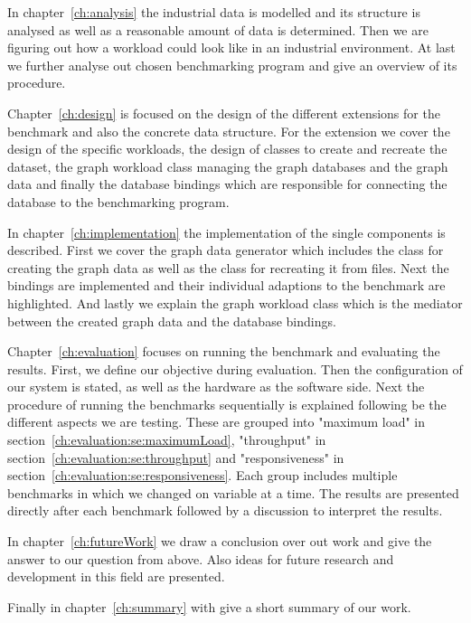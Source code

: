 In chapter~\ref{ch:analysis} the industrial data is modelled and its structure is analysed as well as a reasonable amount of data is determined.
Then we are figuring out how a workload could look like in an industrial environment.
At last we further analyse out chosen benchmarking program and give an overview of its procedure.

Chapter~\ref{ch:design} is focused on the design of the different extensions for the benchmark and also the concrete data structure.
For the extension we cover the design of the specific workloads,
the design of classes to create and recreate the dataset,
the graph workload class managing the graph databases and the graph data and finally the database bindings which are responsible for connecting the database to the benchmarking program.

In chapter~\ref{ch:implementation} the implementation of the single components is described.
First we cover the graph data generator which includes the class for creating the graph data as well as the class for recreating it from files.
Next the bindings are implemented and their individual adaptions to the benchmark are highlighted.
And lastly we explain the graph workload class which is the mediator between the created graph data and the database bindings.

Chapter~\ref{ch:evaluation} focuses on running the benchmark and evaluating the results.
First, we define our objective during evaluation.
Then the configuration of our system is stated, as well as the hardware as the software side.
Next the procedure of running the benchmarks sequentially is explained following be the different aspects we are testing.
These are grouped into "maximum load" in section~\ref{ch:evaluation:se:maximumLoad}, "throughput" in section~\ref{ch:evaluation:se:throughput} and "responsiveness" in section~\ref{ch:evaluation:se:responsiveness}.
Each group includes multiple benchmarks in which we changed on variable at a time.
The results are presented directly after each benchmark followed by a discussion to interpret the results.

In chapter~\ref{ch:futureWork} we draw a conclusion over out work and give the answer to our question from above.
Also ideas for future research and development in this field are presented.

Finally in chapter~\ref{ch:summary} with give a short summary of our work.
